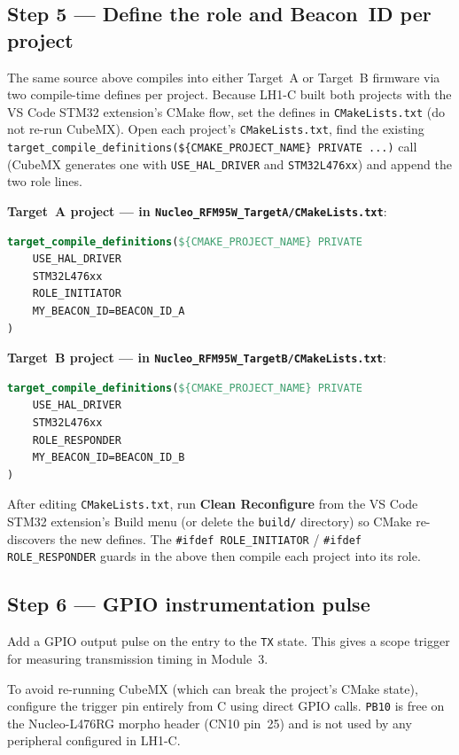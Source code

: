 \documentclass[11pt,letterpaper]{article}
\begin{document}
\newpage
\subsection{Step 5 --- Define the role and Beacon~ID per project}

The same \FSM{} source above compiles into either Target~A or Target~B firmware via two compile-time defines per project. Because LH1-C built both projects with the VS Code STM32 extension's CMake flow, set the defines in \texttt{CMakeLists.txt} (do not re-run CubeMX). Open each project's \texttt{CMakeLists.txt}, find the existing \texttt{target\_compile\_definitions(\$\{CMAKE\_PROJECT\_NAME\} PRIVATE ...)} call (CubeMX generates one with \texttt{USE\_HAL\_DRIVER} and \texttt{STM32L476xx}) and append the two role lines.

\textbf{Target~A project --- in \texttt{Nucleo\_RFM95W\_TargetA/CMakeLists.txt}}:
\begin{lstlisting}[language=CMake, caption={Append to the existing \texttt{target\_compile\_definitions} call.}]
target_compile_definitions(${CMAKE_PROJECT_NAME} PRIVATE
    USE_HAL_DRIVER
    STM32L476xx
    ROLE_INITIATOR
    MY_BEACON_ID=BEACON_ID_A
)
\end{lstlisting}

\textbf{Target~B project --- in \texttt{Nucleo\_RFM95W\_TargetB/CMakeLists.txt}}:
\begin{lstlisting}[language=CMake]
target_compile_definitions(${CMAKE_PROJECT_NAME} PRIVATE
    USE_HAL_DRIVER
    STM32L476xx
    ROLE_RESPONDER
    MY_BEACON_ID=BEACON_ID_B
)
\end{lstlisting}

After editing \texttt{CMakeLists.txt}, run \textbf{Clean Reconfigure} from the VS Code STM32 extension's Build menu (or delete the \texttt{build/} directory) so CMake re-discovers the new defines. The \texttt{\#ifdef ROLE\_INITIATOR} / \texttt{\#ifdef ROLE\_RESPONDER} guards in the \FSM{} above then compile each project into its role.

\newpage
\subsection{Step 6 --- GPIO instrumentation pulse}
Add a \mbox{GPIO} output pulse on the entry to the \texttt{TX} state. This gives a scope trigger for measuring transmission timing in Module~3.

To avoid re-running CubeMX (which can break the project's CMake state), configure the trigger pin entirely from C using direct \HAL{} GPIO calls. \texttt{PB10} is free on the Nucleo-L476RG morpho header (CN10 pin~25) and is not used by any peripheral configured in LH1-C.
\end{document}
